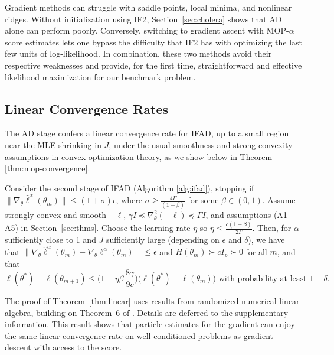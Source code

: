 \documentclass[numsec,webpdf,modern,medium,namedate]{oup-authoring-template}
\newcommand\arxiv[2]{#2} %
\theoremstyle{thmstyleone}%
\theoremstyle{thmstyletwo}%
\theoremstyle{thmstylethree}%
\begin{document}
Gradient methods can struggle with saddle points, local minima, and nonlinear ridges.
Without initialization using IF2, Section~\ref{sec:cholera} shows that AD alone can perform poorly.
Conversely, switching to gradient ascent with MOP-$\alpha$ score estimates lets one bypass the difficulty that IF2 has with optimizing the last few units of log-likelihood. 
In combination, these two methods avoid their respective weaknesses and provide, for the first time, straightforward and effective likelihood maximization for our benchmark problem.


\subsection{Linear Convergence Rates}

The AD stage confers a linear convergence rate for IFAD, up to a small region near the MLE shrinking in $J$, under the usual smoothness and strong convexity assumptions in convex optimization theory, as we show below in Theorem \ref{thm:mop-convergence}.

\begin{thm} \label{thm:linear}
    
Consider the second stage of IFAD (Algorithm \ref{alg:ifad}), stopping if $\|\nabla_\theta \hat\ell^\alpha(\theta_m)\| \leq (1+\sigma) \epsilon$, where $\sigma \geq \frac{4 \Gamma}{(1-\beta)}$ for some $\beta \in (0,1)$. Assume strongly convex and smooth $-\ell$, $\gamma I \preceq \nabla_\theta^2 (-\ell) \preceq \Gamma I$, and assumptions (A1--A5) in Section~\ref{sec:thms}. 
Choose the learning rate $\eta$ so $\eta \leq \frac{c(1-\beta)}{2\Gamma}$. 
Then, for $\alpha$ sufficiently close to 1 and $J$ sufficiently large (depending on $\epsilon$ and $\delta$), we have that
$\|\nabla_\theta \hat\ell^\alpha(\theta_m) - \nabla_\theta\ell^\alpha(\theta_m)\| \leq \epsilon$ and $H(\theta_m) \succ cI_p \succ 0$ for all $m$, and that
\arxiv{}{\vspace*{-3ex}}
$$
\ell(\theta^*) - \ell(\theta_{m+1}) \leq \Big(1-\eta\beta\, \frac{8\gamma}{9c}\Big)\big(\ell(\theta^*)-\ell(\theta_m)\big) \text{ with probability at least } 1-\delta.
$$
\label{thm:mop-convergence}
\end{thm}
\arxiv{}{\vspace*{-10ex}}
The proof of Theorem~\ref{thm:linear} uses results from randomized numerical linear algebra, building on Theorem~6 of \cite{mahoney16}. 
Details are deferred to \arxiv{Appendix~\ref{appendix:convergence}}{the supplementary information}. 
This result shows that particle estimates for the gradient can enjoy the same linear convergence rate on well-conditioned problems as gradient descent with access to the score. 
\end{document}
